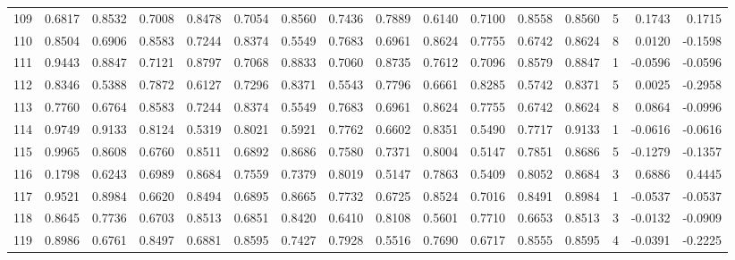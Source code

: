 \begin{tabular}{lrrrrrrrrrrrrrrr}
109 &      0.6817 &  0.8532 &  0.7008 &  0.8478 &  0.7054 &  0.8560 &  0.7436 &  0.7889 &  0.6140 &  0.7100 &   0.8558 &     0.8560 &      5 &                    0.1743 &                     0.1715 \\
110 &      0.8504 &  0.6906 &  0.8583 &  0.7244 &  0.8374 &  0.5549 &  0.7683 &  0.6961 &  0.8624 &  0.7755 &   0.6742 &     0.8624 &      8 &                    0.0120 &                    -0.1598 \\
111 &      0.9443 &  0.8847 &  0.7121 &  0.8797 &  0.7068 &  0.8833 &  0.7060 &  0.8735 &  0.7612 &  0.7096 &   0.8579 &     0.8847 &      1 &                   -0.0596 &                    -0.0596 \\
112 &      0.8346 &  0.5388 &  0.7872 &  0.6127 &  0.7296 &  0.8371 &  0.5543 &  0.7796 &  0.6661 &  0.8285 &   0.5742 &     0.8371 &      5 &                    0.0025 &                    -0.2958 \\
113 &      0.7760 &  0.6764 &  0.8583 &  0.7244 &  0.8374 &  0.5549 &  0.7683 &  0.6961 &  0.8624 &  0.7755 &   0.6742 &     0.8624 &      8 &                    0.0864 &                    -0.0996 \\
114 &      0.9749 &  0.9133 &  0.8124 &  0.5319 &  0.8021 &  0.5921 &  0.7762 &  0.6602 &  0.8351 &  0.5490 &   0.7717 &     0.9133 &      1 &                   -0.0616 &                    -0.0616 \\
115 &      0.9965 &  0.8608 &  0.6760 &  0.8511 &  0.6892 &  0.8686 &  0.7580 &  0.7371 &  0.8004 &  0.5147 &   0.7851 &     0.8686 &      5 &                   -0.1279 &                    -0.1357 \\
116 &      0.1798 &  0.6243 &  0.6989 &  0.8684 &  0.7559 &  0.7379 &  0.8019 &  0.5147 &  0.7863 &  0.5409 &   0.8052 &     0.8684 &      3 &                    0.6886 &                     0.4445 \\
117 &      0.9521 &  0.8984 &  0.6620 &  0.8494 &  0.6895 &  0.8665 &  0.7732 &  0.6725 &  0.8524 &  0.7016 &   0.8491 &     0.8984 &      1 &                   -0.0537 &                    -0.0537 \\
118 &      0.8645 &  0.7736 &  0.6703 &  0.8513 &  0.6851 &  0.8420 &  0.6410 &  0.8108 &  0.5601 &  0.7710 &   0.6653 &     0.8513 &      3 &                   -0.0132 &                    -0.0909 \\
119 &      0.8986 &  0.6761 &  0.8497 &  0.6881 &  0.8595 &  0.7427 &  0.7928 &  0.5516 &  0.7690 &  0.6717 &   0.8555 &     0.8595 &      4 &                   -0.0391 &                    -0.2225 \\

\end{tabular}

